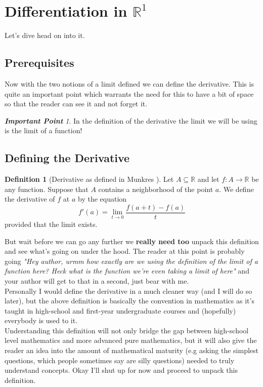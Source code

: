 \documentclass[12pt]{article}
\theoremstyle{definition}
\newtheorem{definition}{Definition}[section]
\numberwithin{theorem}{subsection}
\numberwithin{corollary}{subsection}
\theoremstyle{remark}
\theoremstyle{point}
\newtheorem*{point}{\textbf{Important Point}}
\begin{document}
	\section{Differentiation in $\mathbb{R}^1$}
	Let's dive head on into it.
	\subsection{Prerequisites}
	
	
	Now with the two notions of a limit defined we can define the derivative. This is quite an important point which warrants the need for this to have a bit of space so that the reader can see it and not forget it.
	\medskip
	\begin{point}
		In the definition of the derivative the limit we will be using is the limit of a function!
	\end{point}
	
	\subsection{Defining the Derivative}
	
	
	\begin{definition}[Derivative as defined in Munkres \cite{munkres2018analysis}]
		Let $A \subseteq \mathbb{R}$ and let $f : A \to \mathbb{R}$ be any function. Suppose that $A$ contains a neighborhood of the point $a$. We define the derivative of $f$ at $a$ by the equation $$f'(a) = \lim_{t \to 0} \frac{f(a+t) - f(a)}{t}$$ provided that the limit exists.
	\end{definition}
	
	But wait before we can go any further we \textbf{really need too} unpack this definition and see what's going on under the hood. The reader at this point is probably going \textit{"Hey author, urmm how exactly are we using the definition of the limit of a function here? Heck what is the function we're even taking a limit of here"} and your author will get to that in a second, just bear with me. \\
		
	Personally I would define the derivative in a much cleaner way (and I will do so later), but the above definition is basically the convention in mathematics as it's taught in high-school and first-year undergraduate courses and (hopefully) everybody is used to it. \\
		
	Understanding this definition will not only bridge the gap between high-school level mathematics and more advanced pure mathematics, but it will also give the reader an idea into the amount of mathematical maturity (e.g asking the simplest questions, which people sometimes say are silly questions) needed to truly understand concepts. Okay I'll shut up for now and proceed to unpack this definition. \\
	
\end{document}
